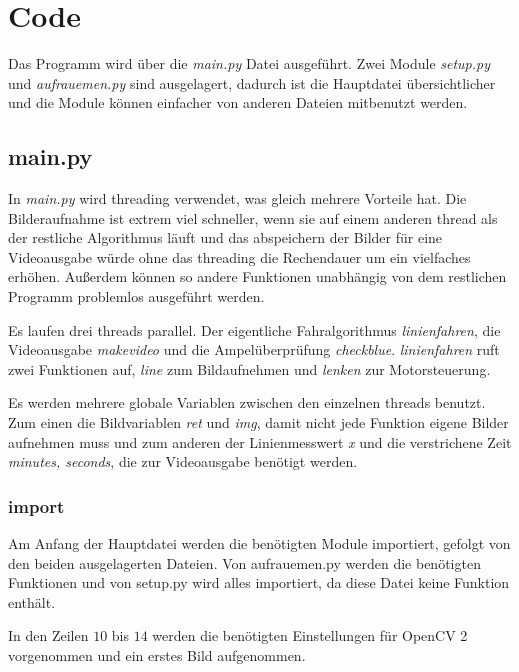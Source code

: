 \documentclass[a4paper, 12pt]{scrartcl}
\begin{document}
\newpage
\section{Code}

Das Programm wird über die \textit{main.py} Datei ausgeführt. Zwei Module \textit{setup.py} und \textit{aufrauemen.py} sind ausgelagert, dadurch ist die Hauptdatei übersichtlicher und die Module können einfacher von anderen Dateien mitbenutzt werden.

\subsection{main.py}

In \textit{main.py} wird threading verwendet, was gleich mehrere Vorteile hat. Die Bilderaufnahme ist extrem viel schneller, wenn sie auf einem anderen thread als der restliche Algorithmus läuft und das abspeichern der Bilder für eine Videoausgabe würde ohne das threading die Rechendauer um ein vielfaches erhöhen. Außerdem können so andere Funktionen unabhängig von dem restlichen Programm problemlos ausgeführt werden.

Es laufen drei threads parallel. Der eigentliche Fahralgorithmus \textit{linienfahren}, die Videoausgabe \textit{makevideo} und die Ampelüberprüfung \textit{checkblue}. \textit{linienfahren} ruft zwei Funktionen auf, \textit{line} zum Bildaufnehmen und \textit{lenken} zur Motorsteuerung.

Es werden mehrere globale Variablen zwischen den einzelnen threads benutzt. Zum einen die Bildvariablen \textit{ret} und \textit{img}, damit nicht jede Funktion eigene Bilder aufnehmen muss und zum anderen der Linienmesswert \textit{x} und die verstrichene Zeit \textit{minutes, seconds}, die zur Videoausgabe benötigt werden.


\subsubsection{import}	%


Am Anfang der Hauptdatei werden die benötigten Module importiert, gefolgt von den beiden ausgelagerten Dateien. Von aufrauemen.py werden die benötigten Funktionen und von setup.py wird alles importiert, da diese Datei keine Funktion enthält.

In den Zeilen $10$ bis $14$ werden die benötigten Einstellungen für OpenCV 2 vorgenommen und ein erstes Bild aufgenommen.
\end{document}
